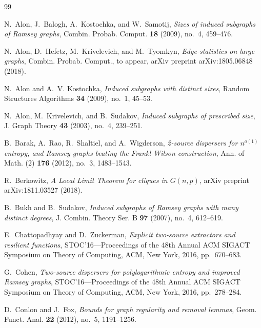 \documentclass{daj}
\theoremstyle{plain}
\theoremstyle{plain}
\theoremstyle{plain}
\theoremstyle{plain}
\theoremstyle{definition}
\theoremstyle{plain}
\theoremstyle{plain}
\theoremstyle{definition}
\theoremstyle{definition}
\theoremstyle{plain}
\begin{document}

\begin{thebibliography}{99}

N.~Alon, J.~Balogh, A.~Kostochka, and W.~Samotij, \emph{Sizes of induced
  subgraphs of {R}amsey graphs}, Combin. Probab. Comput. \textbf{18} (2009),
  no.~4, 459--476.

N.~Alon, D.~Hefetz, M.~Krivelevich, and M.~Tyomkyn, \emph{Edge-statistics on
  large graphs}, Combin. Probab. Comput., to appear, arXiv preprint
  arXiv:1805.06848 (2018).

N.~Alon and A.~V. Kostochka, \emph{Induced subgraphs with distinct sizes},
  Random Structures Algorithms \textbf{34} (2009), no.~1, 45--53.

N.~Alon, M.~Krivelevich, and B.~Sudakov, \emph{Induced subgraphs of prescribed
  size}, J. Graph Theory \textbf{43} (2003), no.~4, 239--251.

B.~Barak, A.~Rao, R.~Shaltiel, and A.~Wigderson, \emph{2-source dispersers for
  {$n^{o(1)}$} entropy, and {R}amsey graphs beating the {F}rankl-{W}ilson
  construction}, Ann. of Math. (2) \textbf{176} (2012), no.~3, 1483--1543.

R.~Berkowitz, \emph{A Local Limit Theorem for cliques in {$G(n,p)$}}, arXiv preprint arXiv:1811.03527 (2018).

B.~Bukh and B.~Sudakov, \emph{Induced subgraphs of {R}amsey graphs with many
  distinct degrees}, J. Combin. Theory Ser. B \textbf{97} (2007), no.~4,
  612--619.

E.~Chattopadhyay and D.~Zuckerman, \emph{Explicit two-source extractors and
  resilient functions}, S{TOC}'16---{P}roceedings of the 48th {A}nnual {ACM}
  {SIGACT} {S}ymposium on {T}heory of {C}omputing, ACM, New York, 2016,
  pp.~670--683.

G.~Cohen, \emph{Two-source dispersers for polylogarithmic entropy and improved
  {R}amsey graphs}, S{TOC}'16---{P}roceedings of the 48th {A}nnual {ACM}
  {SIGACT} {S}ymposium on {T}heory of {C}omputing, ACM, New York, 2016,
  pp.~278--284.

D.~Conlon and J.~Fox, \emph{Bounds for graph regularity and removal lemmas},
  Geom. Funct. Anal. \textbf{22} (2012), no.~5, 1191--1256.


\end{thebibliography}
\end{document}
